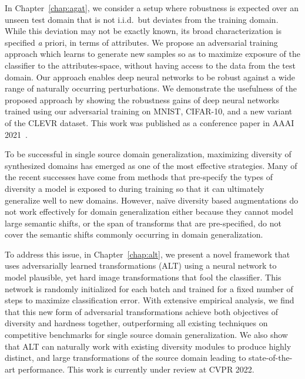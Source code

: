 In Chapter~\ref{chap:agat}, we consider a setup where robustness is expected over an unseen test domain that is not i.i.d.\ but deviates from the training domain.
While this deviation may not be exactly known, its broad characterization is specified \textit{a} priori, in terms of attributes.
We propose an adversarial training approach which learns to generate new samples so as to maximize exposure of the classifier to the attributes-space, without having access to the data from the test domain.
Our approach enables deep neural networks to be robust against a wide range of naturally occurring perturbations.
We demonstrate the usefulness of the proposed approach by showing the robustness gains of deep neural networks trained using our adversarial training on MNIST, CIFAR-10, and a new variant of the CLEVR dataset.
This work was published as a conference paper in AAAI 2021~\citep{gokhale2021attribute}.

To be successful in single source domain generalization, maximizing diversity of synthesized domains has emerged as one of the most effective strategies. Many of the recent successes have come from methods that pre-specify the types of diversity a model is exposed to during training so that it can ultimately generalize well to new domains. However, na\"ive diversity based augmentations do not work effectively for domain generalization either because they cannot model large semantic shifts, or the span of transforms that are pre-specified, do not cover the semantic shifts commonly occurring in domain generalization. 
%
%
%
%

To address this issue, in Chapter~\ref{chap:alt}, we present a novel framework that uses adversarially learned transformations (ALT) using a neural network to model plausible, yet hard image transformations that fool the classifier. This network is randomly initialized for each batch and trained for a fixed number of steps to maximize classification error. 
With extensive empirical analysis, we find that this new form of adversarial transformations achieve both objectives of diversity and hardness together, outperforming all existing techniques on competitive benchmarks for single source domain generalization. 
We also show that ALT can naturally work with existing diversity modules to produce highly distinct, and large transformations of the source domain leading to state-of-the-art performance.
This work is currently under review at CVPR 2022.
%
%
%
%

